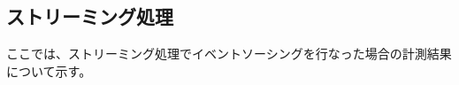 \documentclass[../../../main]{subfiles}
\begin{document}
    \subsection{ストリーミング処理}\label{subsec:result-streaming}

    ここでは、ストリーミング処理でイベントソーシングを行なった場合の計測結果について示す。

    
    
    

    

    

    
\end{document}

